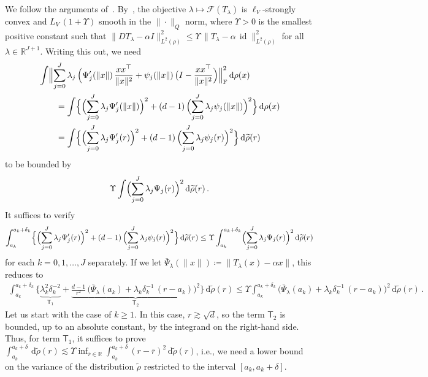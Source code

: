 \documentclass[twoside]{article}
\newcommand{\cF}{\mathcal{F}}
\newcommand{\1}{\mathds{1}}
\DeclareMathOperator{\id}{id}
\newcommand{\R}{\mathbb{R}}
\newcommand*{\defeq}{\coloneqq}
\newcommand*{\rd}{\mathrm{d}}
\newcommand*{\dd}{\, \rd}
\theoremstyle{plain}
\theoremstyle{definition}
\theoremstyle{remark}
\renewcommand{\tilde}{\widetilde}
\begin{document}
We follow the arguments of~\citet{JiaChePoo24MFVI}. By~\citet[Propositions 5.10 and 5.11]{JiaChePoo24MFVI}, the objective $\lambda \mapsto \cF(T_\lambda)$ is $\ell_V$-strongly convex and $L_V\,(1+\Upsilon)$ smooth in the $\|\cdot\|_Q$ norm, where $\Upsilon > 0$ is the smallest positive constant such that $\|DT_\lambda-  \alpha I\|_{L^2(\rho)}^2 \le \Upsilon \,\|T_\lambda - \alpha \,{\id}\|_{L^2(\rho)}^2$ for all $\lambda \in\R^{J+1}$.
Writing this out, we need
\begin{align*}
    &\int \Bigl\lVert \sum_{j=0}^J \lambda_j \,\Bigl(\Psi_j'(\|x\|)\,\frac{xx^\top}{\|x\|^2} + \psi_j(\|x\|)\,\bigl(I - \frac{xx^\top}{\|x\|^2}\Bigr)\Bigr\rVert_{\rm F}^2 \dd \rho(x) \\
    &\qquad = \int \Bigl\{\Bigl(\sum_{j=0}^J \lambda_j \Psi_j'(\|x\|)\Bigr)^2 + (d-1)\,\Bigl(\sum_{j=0}^J \lambda_j \psi_j(\|x\|)\Bigr)^2\Bigr\}\dd\rho(x) \\
    &\qquad = \int \Bigl\{\Bigl(\sum_{j=0}^J \lambda_j \Psi_j'(r)\Bigr)^2 + (d-1)\,\Bigl(\sum_{j=0}^J \lambda_j \psi_j(r)\Bigr)^2\Bigr\}\dd\tilde\rho(r)
\end{align*}
to be bounded by
\begin{align*}
    \Upsilon\int \Bigl(\sum_{j=0}^J \lambda_j \Psi_j(r)\Bigr)^2\dd\tilde\rho(r)\,.
\end{align*}
It suffices to verify
\begin{align*}
    \int_{a_k}^{a_k+\delta_k} \Bigl\{\Bigl(\sum_{j=0}^J \lambda_j \Psi_j'(r)\Bigr)^2 + (d-1)\,\Bigl(\sum_{j=0}^J \lambda_j \psi_j(r)\Bigr)^2\Bigr\}\dd\tilde\rho(r) \le 
    \Upsilon\int_{a_k}^{a_k+\delta_k} \Bigl(\sum_{j=0}^J \lambda_j \Psi_j(r)\Bigr)^2\dd\tilde\rho(r)
\end{align*}
for each $k =0,1,\dotsc,J$ separately.
If we let $\bar \Psi_\lambda(\|x\|) \defeq \|T_\lambda(x) - \alpha x\|$, this reduces to
\begin{align*}
    \int_{a_k}^{a_k+\delta_k} \bigl\{\underbrace{\lambda_k^2 \delta_k^{-2}}_{\mathsf T_1} + \underbrace{\frac{d-1}{r^2}\,\bigl(\bar \Psi_\lambda(a_k) + \lambda_k \delta_k^{-1}\,(r-a_k)\bigr)^2}_{\mathsf T_2}\bigr\}\dd\tilde\rho(r) \le 
    \Upsilon\int_{a_k}^{a_k+\delta_k} \bigl(\bar \Psi_\lambda(a_k) + \lambda_k \delta_k^{-1}\,(r-a_k)\bigr)^2\dd\tilde\rho(r)\,.
\end{align*}
Let us start with the case of $k \ge 1$.
In this case, $r\gtrsim \sqrt d$, so the term $\mathsf T_2$ is bounded, up to an absolute constant, by the integrand on the right-hand side.
Thus, for term $\mathsf T_1$, it suffices to prove $\int_{a_k}^{a_k+\delta} \dd\tilde\rho(r) \lesssim \Upsilon \inf_{\bar r\in \R} \int_{a_k}^{a_k+\delta} (r-\bar r)^2\dd\tilde\rho(r)$, i.e., we need a lower bound on the variance of the distribution $\tilde\rho$ restricted to the interval $[a_k, a_k+\delta]$.
\end{document}
